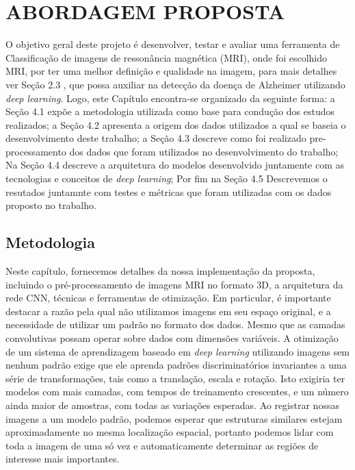 \documentclass[openright]{UFRGS} %
\begin{document}
\chapter{ABORDAGEM PROPOSTA}

O objetivo geral deste projeto é desenvolver, testar e avaliar uma ferramenta de Classificação de imagens de ressonância magnética (MRI), onde foi escolhido MRI, por ter uma melhor definição e qualidade na imagem, para mais detalhes ver Seção 2.3
, que possa auxiliar na detecção da doença de Alzheimer utilizando  \textit{deep learning}. Logo,
este Capítulo encontra-se organizado da seguinte forma: a Seção 4.1 expõe a metodologia utilizada como base para condução dos estudos realizados; a Seção 4.2 apresenta a  origem dos dados utilizados
a qual se baseia o desenvolvimento deste trabalho; a Seção 4.3 descreve como
foi realizado pre-processamento dos dados que foram utilizados no desenvolvimento do trabalho; Na
Seção 4.4 descreve a arquitetura do modelos desenvolvido juntamente com as tecnologias e conceitos de \textit{deep learning}; Por fim na
Seção 4.5  Descrevemos o resutados juntamnte com testes e métricas que foram utilizadas com os dados proposto no trabalho.


\section{Metodologia}
Neste capítulo, fornecemos detalhes da nossa implementação da proposta, incluindo o pré-processamento de imagens MRI no formato 3D,
a arquitetura da rede CNN, técnicas e ferramentas de otimização. Em particular, é importante destacar a
razão pela qual não utilizamos imagens em seu espaço original, e a necessidade de utilizar um padrão no formato dos dados.
Mesmo que as camadas convolutivas possam operar sobre dados com dimensões variáveis.
A otimização de um sistema de aprendizagem baseado em  \textit{deep learning} utilizando imagens sem nenhum padrão exige que ele aprenda
padrões discriminatórios invariantes a uma série de transformações, tais como a translação,
escala e rotação. Isto exigiria ter modelos com mais camadas, com tempos de treinamento crescentes,
e um número ainda maior de amostras, com todas as variações esperadas. Ao registrar nossas
imagens a um modelo padrão, podemos esperar que estruturas similares estejam aproximadamente no
mesma localização espacial, portanto podemos lidar com toda a imagem de uma só vez e automaticamente
determinar as regiões de interesse mais importantes.
\end{document}
